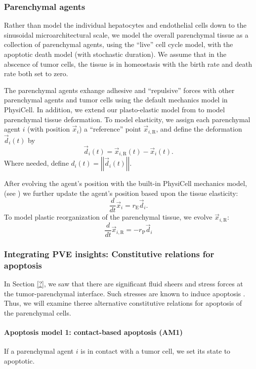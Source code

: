 \documentclass[smallextended,natbib]{svjour3}
\newcommand{\beq}{\begin{equation}}
\newcommand{\eeq}{\end{equation}}
\newcommand{\norm}[1]{\left|\left|#1\right|\right|}
\begin{document}
\subsubsection{Parenchymal agents}
Rather than model the individual hepatocytes and endothelial cells down to the 
sinusoidal microarchitectural scale, we model the overall parenchymal tissue 
as a collection of parenchymal agents, using the ``live'' cell cycle model, 
with the apoptotic death model (with stochastic duration). We assume that in 
the abscence of tumor cells, the tissue is in homeostasis with the birth rate 
and death rate both set to zero. 



The parenchymal agents exhange adhesive and ``repulsive'' forces with 
other parenchymal agents and tumor cells using the default mechanics 
model in PhysiCell. In addition, we extend our plasto-elastic model 
from \cite{?} to model parenchymal tissue deformation. To model 
elasticity, we assign each parenchymal agent $i$ 
(with position $\vec{x}_i$) a ``reference'' point $\vec{x}_{i,\mathrm{R}}$, 
and define the deformation $\vec{d}_i(t)$ by 
\beq
\vec{d}_i(t) = \vec{x}_{i,\mathrm{R}}(t) - \vec{x}_i(t).
\eeq
Where needed, define $d_i(t) = \norm{ \vec{d}_i(t) }$. 

After evolving the agent's position with the built-in PhysiCell mechanics model, 
(see \cite{?}) we further update the agent's position based upon 
the tissue elasticity: 
\beq
\frac{d}{dt} \vec{x}_i = r_\mathrm{E}
\vec{d}_i . 
\eeq
To model plastic reorganization of the parenchymal tissue, 
we evolve $\vec{x}_{i,\mathrm{R}}$: 
\beq
\frac{d}{dt}  \vec{x}_{i,\mathrm{R}} = -r_\mathrm{P} \vec{d}_i 
\eeq

\subsubsection{Integrating PVE insights: Constitutive relations for apoptosis}
In Section \ref{?}, we saw that there are significant fluid sheers and 
stress forces at the tumor-parenchymal interface. 
Such stresses are known to induce apoptosis \cite{?}. Thus, we will 
examine theree alternative constitutive relations for apoptosis of the 
parenchymal cells.

\paragraph{Apoptosis model 1: contact-based apoptosis (AM1)} If a parenchymal agent $i$ is 
in contact with a tumor cell, we set its state to apoptotic. 
\end{document}
